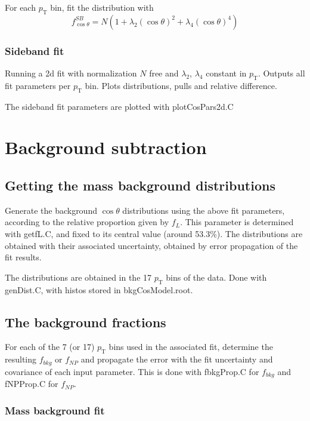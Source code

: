 \documentclass{article}
\newcommand{\pt}{p_\text{T}}
\newcommand{\cost}{\cos\theta}
\begin{document}
For each $\pt$ bin, fit the distribution with
\begin{equation}
f_{\cost}^{SB} = N\left(1+\lambda_2(\cost)^2+\lambda_4(\cost)^4\right)
\end{equation}

\subsubsection{Sideband fit}

Running a 2d fit with normalization $N$ free and $\lambda_2$, $\lambda_4$ constant in $\pt$. Outputs all fit parameters per $\pt$ bin. Plots distributions, pulls and relative difference.

The sideband fit parameters are plotted with plotCosPars2d.C

\pagebreak

\section{Background subtraction}

\subsection{Getting the mass background distributions}

Generate the background $\cost$ distributions using the above fit parameters, according to the relative proportion given by $f_L$. This parameter is determined with getfL.C, and fixed to its central value (around 53.3\%). The distributions are obtained with their associated uncertainty, obtained by error propagation of the fit results.

The distributions are obtained in the 17 $\pt$ bins of the data. Done with genDist.C, with histos stored in bkgCosModel.root.

\subsection{The background fractions}

For each of the 7 (or 17) $\pt$ bins used in the associated fit, determine the resulting $f_{bkg}$ or $f_{NP}$ and propagate the error with the fit uncertainty and covariance of each input parameter. This is done with fbkgProp.C for $f_{bkg}$ and fNPProp.C for $f_{NP}$.

\subsubsection{Mass background fit}
\end{document}
